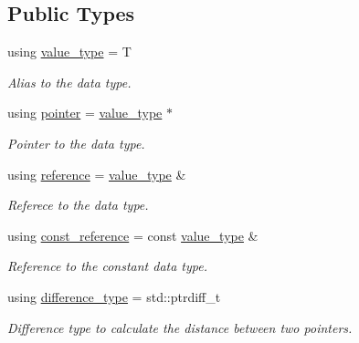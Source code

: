 \subsection*{Public Types}
\begin{DoxyCompactItemize}
\item 
\mbox{\label{classls_1_1my__iterator_aa67b52463c80c463dcb4919c3040903b}} 
using \hyperlink{classls_1_1my__iterator_aa67b52463c80c463dcb4919c3040903b}{value\+\_\+type} = T
\begin{DoxyCompactList}\small\item\em Alias to the data type. \end{DoxyCompactList}\item 
\mbox{\label{classls_1_1my__iterator_a65792c5672e5b22715ec2b58c32e016a}} 
using \hyperlink{classls_1_1my__iterator_a65792c5672e5b22715ec2b58c32e016a}{pointer} = \hyperlink{classls_1_1my__const__iterator_aa7aa8489a065e4ddda33727d33c84b7d}{value\+\_\+type} $\ast$
\begin{DoxyCompactList}\small\item\em Pointer to the data type. \end{DoxyCompactList}\item 
\mbox{\label{classls_1_1my__iterator_ad3b5d3648d5b83344888204a9e6d7bfa}} 
using \hyperlink{classls_1_1my__iterator_ad3b5d3648d5b83344888204a9e6d7bfa}{reference} = \hyperlink{classls_1_1my__const__iterator_aa7aa8489a065e4ddda33727d33c84b7d}{value\+\_\+type} \&
\begin{DoxyCompactList}\small\item\em Referece to the data type. \end{DoxyCompactList}\item 
\mbox{\label{classls_1_1my__iterator_a7a136fd439ffd4ed9d67a794d1001935}} 
using \hyperlink{classls_1_1my__iterator_a7a136fd439ffd4ed9d67a794d1001935}{const\+\_\+reference} = const \hyperlink{classls_1_1my__const__iterator_aa7aa8489a065e4ddda33727d33c84b7d}{value\+\_\+type} \&
\begin{DoxyCompactList}\small\item\em Reference to the constant data type. \end{DoxyCompactList}\item 
\mbox{\label{classls_1_1my__iterator_a706553fcf9e3ea711d454eb7604aae1e}} 
using \hyperlink{classls_1_1my__iterator_a706553fcf9e3ea711d454eb7604aae1e}{difference\+\_\+type} = std\+::ptrdiff\+\_\+t
\begin{DoxyCompactList}\small\item\em Difference type to calculate the distance between two pointers. \end{DoxyCompactList}\end{DoxyCompactItemize}

